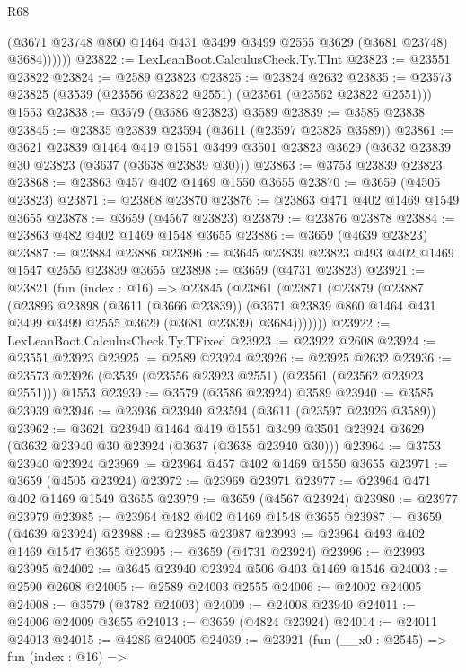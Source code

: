 \begin{lexlean}{R68}
\begin{coremodule}
              (@3671 @23748 @860 @1464 @431 @3499 @3499 @2555 @3629 (@3681 @23748) @3684))))))
@23822 := LexLeanBoot.CalculusCheck.Ty.TInt
@23823 := @23551 @23822
@23824 := @2589 @23823
@23825 := @23824 @2632
@23835 := @23573 @23825 (@3539 (@23556 @23822 @2551) (@23561 (@23562 @23822 @2551))) @1553
@23838 := @3579 (@3586 @23823) @3589
@23839 := @3585 @23838
@23845 := @23835 @23839 @23594 (@3611 (@23597 @23825 @3589))
@23861 := @3621
    @23839
    @1464
    @419
    @1551
    @3499
    @3501
    @23823
    @3629
    (@3632 @23839 @30 @23823 (@3637 (@3638 @23839 @30)))
@23863 := @3753 @23839 @23823
@23868 := @23863 @457 @402 @1469 @1550 @3655
@23870 := @3659 (@4505 @23823)
@23871 := @23868 @23870
@23876 := @23863 @471 @402 @1469 @1549 @3655
@23878 := @3659 (@4567 @23823)
@23879 := @23876 @23878
@23884 := @23863 @482 @402 @1469 @1548 @3655
@23886 := @3659 (@4639 @23823)
@23887 := @23884 @23886
@23896 := @3645 @23839 @23823 @493 @402 @1469 @1547 @2555 @23839 @3655
@23898 := @3659 (@4731 @23823)
@23921 := @23821
    (fun (index : @16) =>
    @23845
      (@23861
        (@23871
          (@23879
            (@23887
              (@23896
                @23898
                (@3611 (@3666 @23839))
                (@3671 @23839 @860 @1464 @431 @3499 @3499 @2555 @3629 (@3681 @23839) @3684)))))))
@23922 := LexLeanBoot.CalculusCheck.Ty.TFixed
@23923 := @23922 @2608
@23924 := @23551 @23923
@23925 := @2589 @23924
@23926 := @23925 @2632
@23936 := @23573 @23926 (@3539 (@23556 @23923 @2551) (@23561 (@23562 @23923 @2551))) @1553
@23939 := @3579 (@3586 @23924) @3589
@23940 := @3585 @23939
@23946 := @23936 @23940 @23594 (@3611 (@23597 @23926 @3589))
@23962 := @3621
    @23940
    @1464
    @419
    @1551
    @3499
    @3501
    @23924
    @3629
    (@3632 @23940 @30 @23924 (@3637 (@3638 @23940 @30)))
@23964 := @3753 @23940 @23924
@23969 := @23964 @457 @402 @1469 @1550 @3655
@23971 := @3659 (@4505 @23924)
@23972 := @23969 @23971
@23977 := @23964 @471 @402 @1469 @1549 @3655
@23979 := @3659 (@4567 @23924)
@23980 := @23977 @23979
@23985 := @23964 @482 @402 @1469 @1548 @3655
@23987 := @3659 (@4639 @23924)
@23988 := @23985 @23987
@23993 := @23964 @493 @402 @1469 @1547 @3655
@23995 := @3659 (@4731 @23924)
@23996 := @23993 @23995
@24002 := @3645 @23940 @23924 @506 @403 @1469 @1546
@24003 := @2590 @2608
@24005 := @2589 @24003 @2555
@24006 := @24002 @24005
@24008 := @3579 (@3782 @24003)
@24009 := @24008 @23940
@24011 := @24006 @24009 @3655
@24013 := @3659 (@4824 @23924)
@24014 := @24011 @24013
@24015 := @4286 @24005
@24039 := @23921
    (fun (__x0 : @2545) =>
    fun (index : @16) =>

\end{coremodule}
\end{lexlean}
